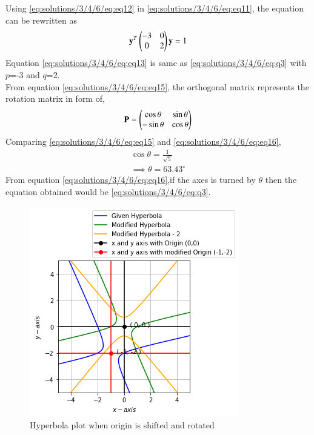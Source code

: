 Using \eqref{eq:solutions/3/4/6/eq:eq12} in \eqref{eq:solutions/3/4/6/eq:eq11}, the equation can be rewritten as
\begin{align}
     \mathbf{y}^T\begin{pmatrix}-3&0\\0&2\end{pmatrix}\mathbf{y}=1 \label{eq:solutions/3/4/6/eq:eq13}
\end{align}
Equation \eqref{eq:solutions/3/4/6/eq:eq13} is same as \eqref{eq:solutions/3/4/6/eq:q3} with $p$=-3 and $q$=2.\\
From equation \eqref{eq:solutions/3/4/6/eq:eq15}, the orthogonal matrix represents the rotation matrix in form of,
\begin{align}
    \mathbf{P}=\begin{pmatrix}\cos\theta & \sin\theta\\ -\sin\theta& \cos\theta\end{pmatrix} \label{eq:solutions/3/4/6/eq:eq16}
\end{align}
Comparing \eqref{eq:solutions/3/4/6/eq:eq15} and \eqref{eq:solutions/3/4/6/eq:eq16},
\begin{align}
    \cos\theta = \frac{1}{\sqrt{5}}\\
    \implies \boxed{\theta = 63.43^{\circ}}
\end{align}
From equation \eqref{eq:solutions/3/4/6/eq:eq16},if the axes is turned by $\theta$ then the equation obtained would be \eqref{eq:solutions/3/4/6/eq:q3}.
\begin{figure}[h!]
	\centering
	\includegraphics[width=\columnwidth]{./solutions/3/4/6/hyperbola.png}
	\caption{Hyperbola plot when origin is shifted and rotated}
	\label{eq:solutions/3/4/6/myfig}
\end{figure}
